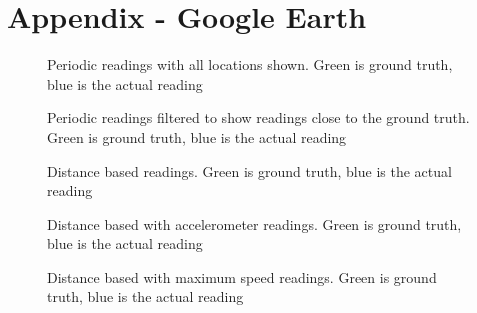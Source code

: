 \section{Appendix - Google Earth}

\begin{figure}

\caption{Periodic readings with all locations shown. Green is ground truth, blue is the actual reading}
\end{figure}

\begin{figure}

\caption{Periodic readings filtered to show readings close to the ground truth. Green is ground truth, blue is the actual reading}
\end{figure}

\begin{figure}

\caption{Distance based readings. Green is ground truth, blue is the actual reading}
\end{figure}

\begin{figure}

\caption{Distance based with accelerometer readings. Green is ground truth, blue is the actual reading}
\end{figure}

\begin{figure}

\caption{Distance based with maximum speed readings. Green is ground truth, blue is the actual reading}
\end{figure}